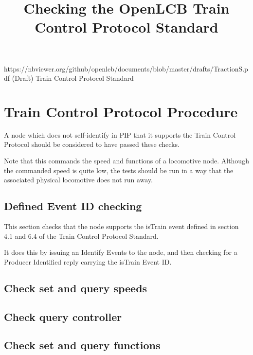 

\title{Checking the OpenLCB Train Control Protocol Standard}


\maketitle


\introductionCaveats
    {https://nbviewer.org/github/openlcb/documents/blob/master/drafts/TractionS.pdf}
    {(Draft) Train Control Protocol Standard}

\section{Train Control Protocol Procedure}


A node which does not self-identify in PIP that it supports
the Train Control Protocol should be considered to have passed these checks.
\pipsetFootnote

Note that this commands the speed and functions of a locomotive node.
Although the commanded speed is quite low, the
tests should be run in a way that the associated physical locomotive
does not run away.

\subsection{Defined Event ID checking}

This section checks that the node supports the isTrain event
defined in section 4.1 and 6.4 of the Train Control Protocol Standard.

It does this by issuing an Identify Events to the node, and then
checking for a Producer Identified reply carrying the isTrain Event ID.

\subsection{Check set and query speeds}

\subsection{Check query controller}

\subsection{Check set and query functions}

